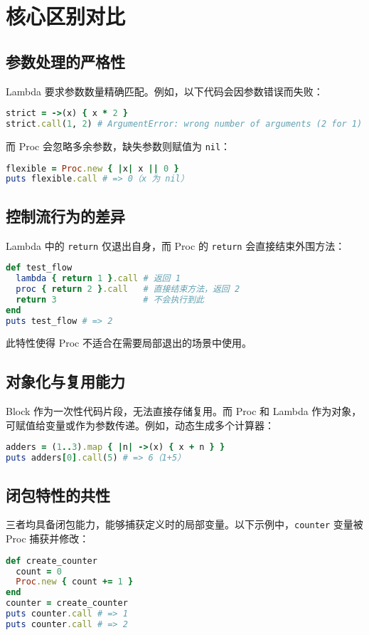 \chapter{核心区别对比}
\section{参数处理的严格性}
Lambda 要求参数数量精确匹配。例如，以下代码会因参数错误而失败：\par
\begin{lstlisting}[language=ruby]
strict = ->(x) { x * 2 }
strict.call(1, 2) # ArgumentError: wrong number of arguments (2 for 1)
\end{lstlisting}
而 Proc 会忽略多余参数，缺失参数则赋值为 \verb!nil!：\par
\begin{lstlisting}[language=ruby]
flexible = Proc.new { |x| x || 0 }
puts flexible.call # => 0（x 为 nil）
\end{lstlisting}
\section{控制流行为的差异}
Lambda 中的 \verb!return! 仅退出自身，而 Proc 的 \verb!return! 会直接结束外围方法：\par
\begin{lstlisting}[language=ruby]
def test_flow
  lambda { return 1 }.call # 返回 1
  proc { return 2 }.call   # 直接结束方法，返回 2
  return 3                 # 不会执行到此
end
puts test_flow # => 2
\end{lstlisting}
此特性使得 Proc 不适合在需要局部退出的场景中使用。\par
\section{对象化与复用能力}
Block 作为一次性代码片段，无法直接存储复用。而 Proc 和 Lambda 作为对象，可赋值给变量或作为参数传递。例如，动态生成多个计算器：\par
\begin{lstlisting}[language=ruby]
adders = (1..3).map { |n| ->(x) { x + n } }
puts adders[0].call(5) # => 6（1+5）
\end{lstlisting}
\section{闭包特性的共性}
三者均具备闭包能力，能够捕获定义时的局部变量。以下示例中，\verb!counter! 变量被 Proc 捕获并修改：\par
\begin{lstlisting}[language=ruby]
def create_counter
  count = 0
  Proc.new { count += 1 }
end
counter = create_counter
puts counter.call # => 1
puts counter.call # => 2
\end{lstlisting}
